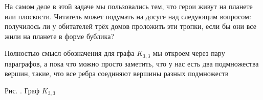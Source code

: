 	На самом деле в этой задаче мы пользовались тем, что герои живут на планете или плоскости. Читатель может подумать на 
	досуге над следующим вопросом: получилось ли у обитателей трёх домов проложить эти тропки, если бы они все жили на планете в форме бублика?
	
\begin{paracol}{2}

	Полностью смысл обозначения для графа $K_{3, 3}$ мы откроем через пару параграфов, а пока что можно просто заметить, 
	что у нас есть два подмножества вершин, такие, что все ребра соединяют вершины разных подмножеств
	
\switchcolumn

\begin{center}

	\small Рис. \images. Граф $K_{3, 3}$
\end{center}
\end{paracol}


